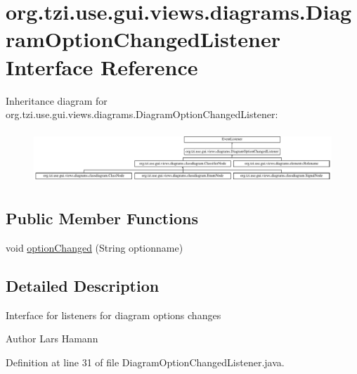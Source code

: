 \hypertarget{interfaceorg_1_1tzi_1_1use_1_1gui_1_1views_1_1diagrams_1_1_diagram_option_changed_listener}{\section{org.\-tzi.\-use.\-gui.\-views.\-diagrams.\-Diagram\-Option\-Changed\-Listener Interface Reference}
\label{interfaceorg_1_1tzi_1_1use_1_1gui_1_1views_1_1diagrams_1_1_diagram_option_changed_listener}
}
Inheritance diagram for org.\-tzi.\-use.\-gui.\-views.\-diagrams.\-Diagram\-Option\-Changed\-Listener\-:\begin{figure}[H]
\begin{center}
\leavevmode
\includegraphics[height=1.991111cm]{interfaceorg_1_1tzi_1_1use_1_1gui_1_1views_1_1diagrams_1_1_diagram_option_changed_listener}
\end{center}
\end{figure}
\subsection*{Public Member Functions}
\begin{DoxyCompactItemize}
\item 
void \hyperlink{interfaceorg_1_1tzi_1_1use_1_1gui_1_1views_1_1diagrams_1_1_diagram_option_changed_listener_afbc70d553558dddd9576351587153cbc}{option\-Changed} (String optionname)
\end{DoxyCompactItemize}


\subsection{Detailed Description}
Interface for listeners for diagram options changes \begin{DoxyAuthor}{Author}
Lars Hamann 
\end{DoxyAuthor}


Definition at line 31 of file Diagram\-Option\-Changed\-Listener.\-java.



